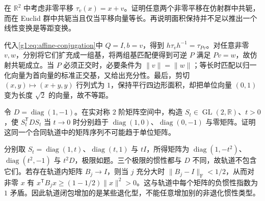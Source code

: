 \begin{exercise}\label{g1:ex:affine-versus-euclidean}
	在 \(\mathbb R^2\) 中考虑非零平移 \(\tau_v(x)=x+v\)。证明任意两个非零平移在仿射群中共轭，而在 Euclid 群中共轭当且仅当平移向量等长。再说明面积保持并不足以推出一个线性变换是等距变换。
\end{exercise}
\begin{solution}
	代入\eqref{g1:eq:affine-conjugation}中 \(Q=I,b=v\)，得到 \(h\tau_vh^{-1}=\tau_{Pv}\)。对任意非零 \(v,w\)，分别将它们扩充成一组基，将两组基匹配便得到可逆 \(P\) 满足 \(Pv=w\)，故仿射共轭成立。当 \(P\) 必须正交时，必要条件为 \(\lVert v\rVert=\lVert w\rVert\)；等长时匹配以归一化向量为首向量的标准正交基，又给出充分性。最后，剪切 \((x,y)\mapsto(x+y,y)\) 行列式为 \(1\)，保持平行四边形面积，却把单位向量 \((0,1)\) 变为长度 \(\sqrt2\) 的向量，故不等距。
\end{solution}

\begin{exercise}\label{g1:ex:orbit-closure}
	令 \(D=\operatorname{diag}(1,-1)\)。在实对称 \(2\) 阶矩阵空间中，构造 \(S_t\in\operatorname{GL}(2,\mathbb R)\)、\(t>0\)，使 \(S_t^{\mathsf T}DS_t\) 当 \(t\rightarrow0\) 时分别趋于 \(\operatorname{diag}(1,0)\)、\(\operatorname{diag}(0,-1)\) 与零矩阵。证明这同一个合同轨道中的矩阵序列不可能趋于单位矩阵。
\end{exercise}
\begin{solution}
	分别取 \(S_t=\operatorname{diag}(1,t)\)、\(\operatorname{diag}(t,1)\) 与 \(tI\)，所得矩阵为 \(\operatorname{diag}(1,-t^2)\)、\(\operatorname{diag}(t^2,-1)\) 与 \(t^2D\)，极限如题。三个极限的惯性都与 \(D\) 不同，故轨道不包含它们。若存在轨道内矩阵 \(B_j\rightarrow I\)，则当 \(j\) 充分大时 \(\lVert B_j-I\rVert_{\mathrm F}<1/2\)，从而对非零 \(x\) 有 \(x^{\mathsf T}B_jx\ge(1-1/2)\lVert x\rVert^2>0\)。这与轨道中每个矩阵的负惯性指数为 \(1\) 矛盾。因此轨道闭包增加的是某些退化型，不能任意增加别的非退化惯性类型。
\end{solution}
